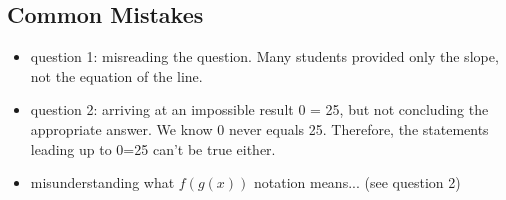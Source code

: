 \documentclass[a4paper, 12pt]{article}
\begin{document}
\subsection*{Common Mistakes}

\begin{itemize}
    \item question 1: misreading the question. Many students provided only the slope, not the equation of the line. 
    \item question 2: arriving at an impossible result 0 = 25, but not concluding the appropriate answer. We know 0 never equals 25. Therefore, the statements leading up to 0=25 can't be true either.
    \item misunderstanding what $f(g(x))$ notation means... (see question 2)
\end{itemize}
\end{document}
